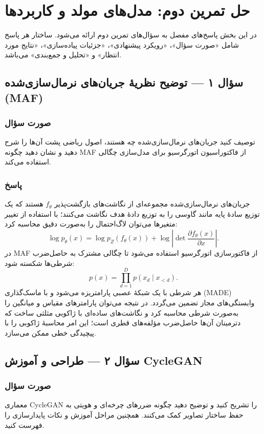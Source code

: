 \renewcommand{\chaptername}{سوال}
\chapter{حل تمرین دوم: مدل‌های مولد و کاربردها}

در این بخش پاسخ‌های مفصل به سؤال‌های تمرین دوم ارائه می‌شود. ساختار هر پاسخ شامل «صورت سؤال»، «رویکرد پیشنهادی»، «جزئیات پیاده‌سازی»، «نتایج مورد انتظار» و «تحلیل و جمع‌بندی» می‌باشد.

\section{سؤال ۱ — توضیح نظریهٔ جریان‌های نرمال‌سازی‌شده (MAF)}
\subsection{صورت سؤال}
توصیف کنید جریان‌های نرمال‌سازی‌شده چه هستند، اصول ریاضی پشت آن‌ها را شرح دهید و نشان دهید چگونه MAF از فاکتوراسیون اتورگرسیو برای مدل‌سازی چگالی استفاده می‌کند.

\subsection{پاسخ}
جریان‌های نرمال‌سازی‌شده مجموعه‌ای از نگاشت‌های بازگشت‌پذیر $f_{\theta}$ هستند که یک توزیع سادهٔ پایه مانند گاوسی را به توزیع دادهٔ هدف نگاشت می‌کنند؛ با استفاده از تغییر متغیرها می‌توان لاگ‌احتمال را به‌صورت دقیق محاسبه کرد:
\begin{equation}
\log p_{\theta}(x) = \log p_Z(f_{\theta}(x)) + \log\left|\det \frac{\partial f_{\theta}(x)}{\partial x}\right|.
\end{equation}
در MAF از فاکتورسازی اتورگرسیو استفاده می‌شود تا چگالی مشترک به حاصل‌ضرب شرطی‌ها شکسته شود:
\begin{equation}
p(x)=\prod_{d=1}^D p(x_d\mid x_{<d}).
\end{equation}
هر شرطی با یک شبکهٔ عصبی پارامتریزه می‌شود و با ماسک‌گذاری (MADE) وابستگی‌های مجاز تضمین می‌گردد. در نتیجه می‌توان پارامترهای مقیاس و میانگین را به‌صورت شرطی محاسبه کرد و نگاشت‌های ساده‌ای با ژاکوبی مثلثی ساخت که دترمینان آن‌ها حاصل‌ضرب مؤلفه‌های قطری است؛ این امر محاسبهٔ ژاکوبی را با پیچیدگی خطی ممکن می‌سازد.

\section{سؤال ۲ — طراحی و آموزش CycleGAN}
\subsection{صورت سؤال}
معماری CycleGAN را تشریح کنید و توضیح دهید چگونه ضررهای چرخه‌ای و هویتی به حفظ ساختار تصاویر کمک می‌کنند. همچنین مراحل آموزش و نکات پایدارسازی را فهرست کنید.

